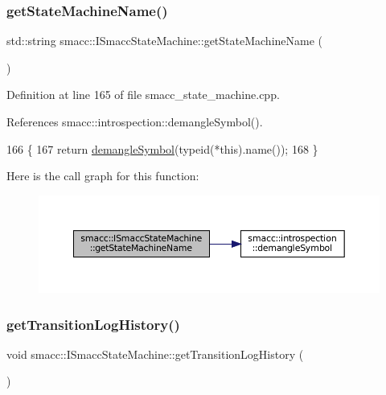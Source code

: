 \subsubsection{\texorpdfstring{get\+State\+Machine\+Name()}{getStateMachineName()}}
{\footnotesize\ttfamily std\+::string smacc\+::\+I\+Smacc\+State\+Machine\+::get\+State\+Machine\+Name (\begin{DoxyParamCaption}{ }\end{DoxyParamCaption})}



Definition at line 165 of file smacc\+\_\+state\+\_\+machine.\+cpp.



References smacc\+::introspection\+::demangle\+Symbol().


\begin{DoxyCode}
166 \{
167     \textcolor{keywordflow}{return} \hyperlink{namespacesmacc_1_1introspection_a2f495108db3e57604d8d3ff5ef030302}{demangleSymbol}(\textcolor{keyword}{typeid}(*this).name());
168 \}
\end{DoxyCode}
Here is the call graph for this function\+:
\nopagebreak
\begin{figure}[H]
\begin{center}
\leavevmode
\includegraphics[width=350pt]{classsmacc_1_1ISmaccStateMachine_a2d0b1742f17dd77d5df217153e8b5259_cgraph}
\end{center}
\end{figure}
\mbox{\label{classsmacc_1_1ISmaccStateMachine_ae7c08fc2addf8ee4785f721050e6a763}} 
\subsubsection{\texorpdfstring{get\+Transition\+Log\+History()}{getTransitionLogHistory()}\hspace{0.1cm}{\footnotesize\ttfamily [1/2]}}
{\footnotesize\ttfamily void smacc\+::\+I\+Smacc\+State\+Machine\+::get\+Transition\+Log\+History (\begin{DoxyParamCaption}{ }\end{DoxyParamCaption})}



